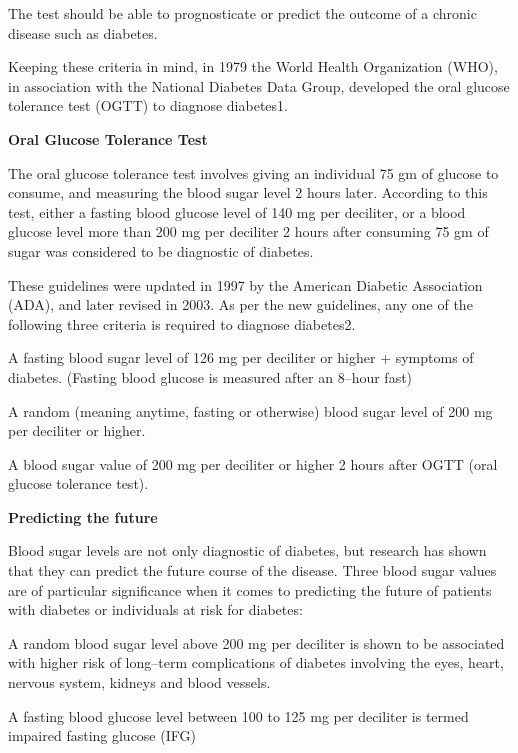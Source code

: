 \item The test should be able to prognosticate or predict the outcome of a chronic disease such as diabetes.

Keeping these criteria in mind, in 1979 the World Health Organization (WHO), in association with the National Diabetes Data Group, developed the oral glucose tolerance test (OGTT) to diagnose diabetes1.

\textbf{Oral Glucose Tolerance Test}

The oral glucose tolerance test involves giving an individual 75 gm of glucose to consume, and measuring the blood sugar level 2 hours later. According to this test, either a fasting blood glucose level of 140 mg per deciliter, or a blood glucose level more than 200 mg per deciliter 2 hours after consuming 75 gm of sugar was considered to be diagnostic of diabetes.

These guidelines were updated in 1997 by the American Diabetic Association (ADA), and later revised in 2003. As per the new guidelines, any one of the following three criteria is required to diagnose diabetes2.

\item A fasting blood sugar level of 126 mg per deciliter or higher + symptoms of diabetes. (Fasting blood glucose is measured after an 8–hour fast)

 \item A random (meaning anytime, fasting or otherwise) blood sugar level of 200 mg per deciliter or higher.

 \item A blood sugar value of 200 mg per deciliter or higher 2 hours after OGTT (oral glucose tolerance test).

\textbf{Predicting the future}

Blood sugar levels are not only diagnostic of diabetes, but research has shown that they can predict the future course of the disease. Three blood sugar values are of particular significance when it comes to predicting the future of patients with diabetes or individuals at risk for diabetes:

\item A random blood sugar level above 200 mg per deciliter is shown to be associated with higher risk of long–term complications of diabetes involving the eyes, heart, nervous system, kidneys and blood vessels.

 \item A fasting blood glucose level between 100 to 125 mg per deciliter is termed impaired fasting glucose (IFG)

